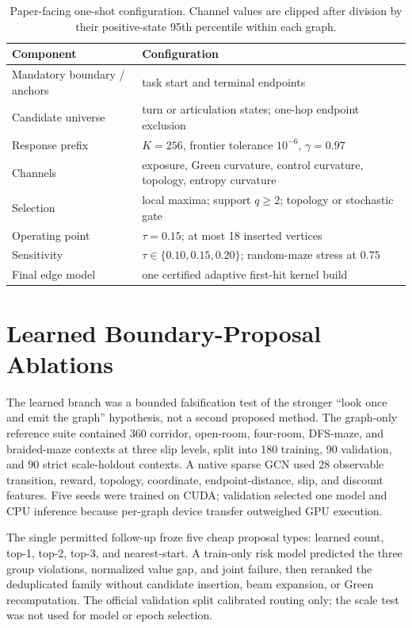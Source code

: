 \documentclass[10pt]{article}
\begin{document}
\begin{table}[H]
\centering
\caption{Paper-facing one-shot configuration. Channel values are clipped after
division by their positive-state 95th percentile within each graph.}
\label{tab:one-shot-config}
\footnotesize
\begin{tabular}{ll}
\toprule
Component & Configuration\\
\midrule
Mandatory boundary / anchors & task start and terminal endpoints\\
Candidate universe & turn or articulation states; one-hop endpoint exclusion\\
Response prefix & $K=256$, frontier tolerance $10^{-6}$, $\gamma=0.97$\\
Channels & exposure, Green curvature, control curvature, topology, entropy curvature\\
Selection & local maxima; support $q\geq2$; topology or stochastic gate\\
Operating point & $\tau=0.15$; at most 18 inserted vertices\\
Sensitivity & $\tau\in\{0.10,0.15,0.20\}$; random-maze stress at $0.75$\\
Final edge model & one certified adaptive first-hit kernel build\\
\bottomrule
\end{tabular}
\end{table}

\section{Learned Boundary-Proposal Ablations}
\label{app:learned}
The learned branch was a bounded falsification test of the stronger ``look once
and emit the graph'' hypothesis, not a second proposed method. The graph-only
reference suite contained 360 corridor, open-room, four-room, DFS-maze, and
braided-maze contexts at three slip levels, split into 180 training, 90
validation, and 90 strict scale-holdout contexts. A native sparse GCN
\citep{kipf2017gcn} used 28 observable transition, reward, topology, coordinate,
endpoint-distance, slip, and discount features. Five seeds were trained on
CUDA; validation selected one model and CPU inference because per-graph device
transfer outweighed GPU execution.

The single permitted follow-up froze five cheap proposal types: learned count,
top-1, top-2, top-3, and nearest-start. A train-only risk model predicted the
three group violations, normalized value gap, and joint failure, then reranked
the deduplicated family without candidate insertion, beam expansion, or Green
recomputation. The official validation split calibrated routing only; the scale
test was not used for model or epoch selection.
\end{document}
